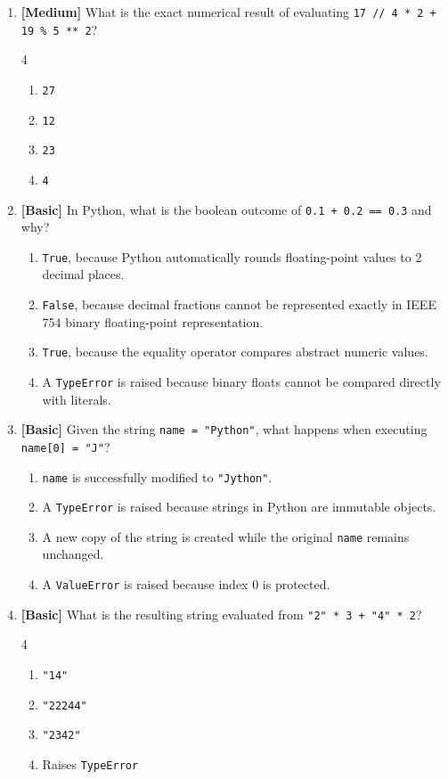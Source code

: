 \documentclass[11pt,a4paper]{article}
\begin{document}
\begin{enumerate}[label=\textbf{Q\arabic*.},leftmargin=1.8em,itemsep=0.8pt,topsep=0.3pt,resume]

\item \textbf{[Medium]} What is the exact numerical result of evaluating \texttt{17 // 4 * 2 + 19 \% 5 ** 2}?
\begin{multicols}{4}
\begin{enumerate}[label=\Alph*.]
  \item \texttt{27}
  \item \texttt{12}
  \item \texttt{23}
  \item \texttt{4}
\end{enumerate}
\end{multicols}

\item \textbf{[Basic]} In Python, what is the boolean outcome of \texttt{0.1 + 0.2 == 0.3} and why?
\begin{enumerate}[label=\Alph*.,leftmargin=1.8em]
  \item \texttt{True}, because Python automatically rounds floating-point values to 2 decimal places.
  \item \texttt{False}, because decimal fractions cannot be represented exactly in IEEE 754 binary floating-point representation.
  \item \texttt{True}, because the equality operator compares abstract numeric values.
  \item A \texttt{TypeError} is raised because binary floats cannot be compared directly with literals.
\end{enumerate}

\item \textbf{[Basic]} Given the string \texttt{name = "Python"}, what happens when executing \texttt{name[0] = "J"}?
\begin{enumerate}[label=\Alph*.,leftmargin=1.8em]
  \item \texttt{name} is successfully modified to \texttt{"Jython"}.
  \item A \texttt{TypeError} is raised because strings in Python are immutable objects.
  \item A new copy of the string is created while the original \texttt{name} remains unchanged.
  \item A \texttt{ValueError} is raised because index 0 is protected.
\end{enumerate}

\item \textbf{[Basic]} What is the resulting string evaluated from \texttt{"2" * 3 + "4" * 2}?
\begin{multicols}{4}
\begin{enumerate}[label=\Alph*.]
  \item \texttt{"14"}
  \item \texttt{"22244"}
  \item \texttt{"2342"}
  \item Raises \texttt{TypeError}
\end{enumerate}
\end{multicols}


\end{enumerate}
\end{document}
